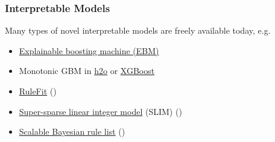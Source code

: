 \documentclass[11pt,
               aspectratio=169,
               hyperref={colorlinks}
               ]{beamer}
\begin{document}
	\begin{frame}
	
		\frametitle{Interpretable Models}
		
		Many types of novel interpretable models are freely available today, e.g. 
		
		\begin{itemize}
			\item \href{https://github.com/microsoft/interpret}{Explainable boosting machine (EBM)}
			\item Monotonic GBM in \href{https://github.com/h2oai/h2o-3}{h2o} or \href{https://github.com/dmlc/xgboost}{XGBoost}
			\item \href{https://cran.r-project.org/web/packages/pre/index.html}{RuleFit} (\citet{rulefit})
			\item \href{https://github.com/ustunb/slim-python}{Super-sparse linear integer model} (SLIM)	(\citet{slim})
			\item \href{https://cran.r-project.org/web/packages/sbrl/index.html}{Scalable Bayesian rule list} (\citet{sbrl})

		
		\end{itemize}	
	
	\end{frame}	
\end{document}
